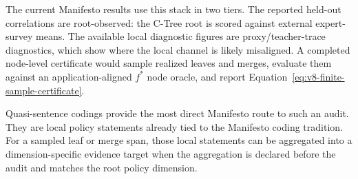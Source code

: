 The current Manifesto results use this stack in two tiers. The reported
held-out correlations are root-observed: the C-Tree root is scored against
external expert-survey means. The available local diagnostic figures are
proxy/teacher-trace diagnostics, which show where the local channel is likely
misaligned. A completed node-level certificate would sample realized leaves
and merges, evaluate them against an application-aligned \(f^\ast\) node
oracle, and report Equation~\eqref{eq:v8-finite-sample-certificate}.

Quasi-sentence codings provide the most direct Manifesto route to such an
audit. They are local policy statements already tied to the Manifesto coding
tradition. For a sampled leaf or merge span, those local statements can be
aggregated into a dimension-specific evidence target when the aggregation is
declared before the audit and matches the root policy dimension.
